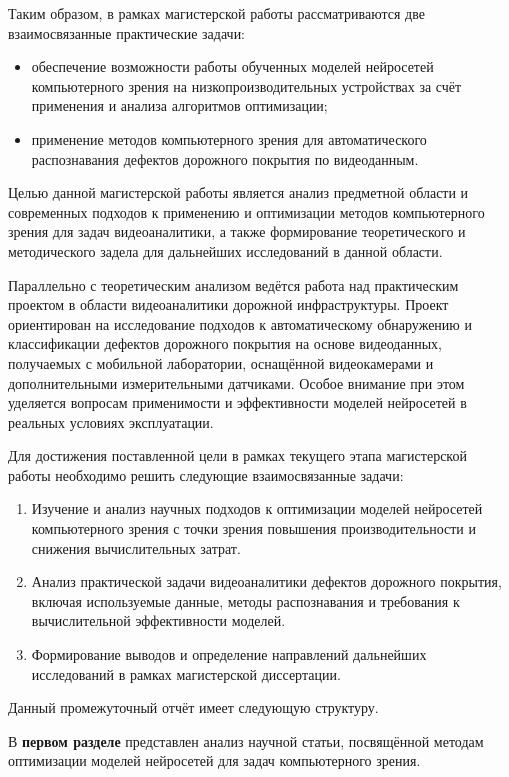 \documentclass[a4paper,12pt]{article}
\begin{document}
Таким образом, в рамках магистерской работы рассматриваются две взаимосвязанные практические задачи:
\begin{itemize}
    \item обеспечение возможности работы обученных моделей нейросетей компьютерного зрения на низкопроизводительных устройствах за счёт применения и анализа алгоритмов оптимизации;
    \item применение методов компьютерного зрения для автоматического распознавания дефектов дорожного покрытия по видеоданным.
\end{itemize}

Целью данной магистерской работы является анализ предметной области и современных подходов к применению и оптимизации методов компьютерного зрения для задач видеоаналитики, а также формирование теоретического и методического задела для дальнейших исследований в данной области.

Параллельно с теоретическим анализом ведётся работа над практическим проектом в области видеоаналитики дорожной инфраструктуры. Проект ориентирован на исследование подходов к автоматическому обнаружению и классификации дефектов дорожного покрытия на основе видеоданных, получаемых с мобильной лаборатории, оснащённой видеокамерами и дополнительными измерительными датчиками. Особое внимание при этом уделяется вопросам применимости и эффективности моделей нейросетей в реальных условиях эксплуатации.

Для достижения поставленной цели в рамках текущего этапа магистерской работы необходимо решить следующие взаимосвязанные задачи:
\begin{enumerate}
    \item Изучение и анализ научных подходов к оптимизации моделей нейросетей компьютерного зрения с точки зрения повышения производительности и снижения вычислительных затрат.
    \item Анализ практической задачи видеоаналитики дефектов дорожного покрытия, включая используемые данные, методы распознавания и требования к вычислительной эффективности моделей.
    \item Формирование выводов и определение направлений дальнейших исследований в рамках магистерской диссертации.
\end{enumerate}

Данный промежуточный отчёт имеет следующую структуру.

В \textbf{первом разделе} представлен анализ научной статьи, посвящённой методам оптимизации моделей нейросетей для задач компьютерного зрения.
\end{document}
